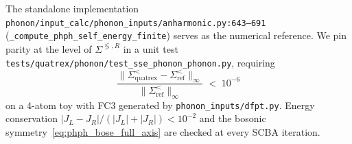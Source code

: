 The standalone implementation
\texttt{phonon/input\_calc/phonon\_inputs/anharmonic.py:643--691}
(\texttt{\_compute\_phph\_self\_energy\_finite}) serves as the numerical
reference. We pin parity at the level of $\Sigma^{\lessgtr,R}$ in a
unit test
\texttt{tests/quatrex/phonon/test\_sse\_phonon\_phonon.py}, requiring
\begin{equation*}
  \frac{\bigl\|\Sigma^{<}_{\text{quatrex}}-\Sigma^{<}_{\text{ref}}\bigr\|_{\infty}}
       {\bigl\|\Sigma^{<}_{\text{ref}}\bigr\|_{\infty}}
  \;<\;10^{-6}
\end{equation*}
on a 4-atom toy with FC3 generated by
\texttt{phonon\_inputs/dfpt.py}. Energy conservation
$|J_L - J_R| / (|J_L|+|J_R|) < 10^{-2}$ and the bosonic
symmetry~\eqref{eq:phph_bose_full_axis} are checked at every SCBA
iteration.

